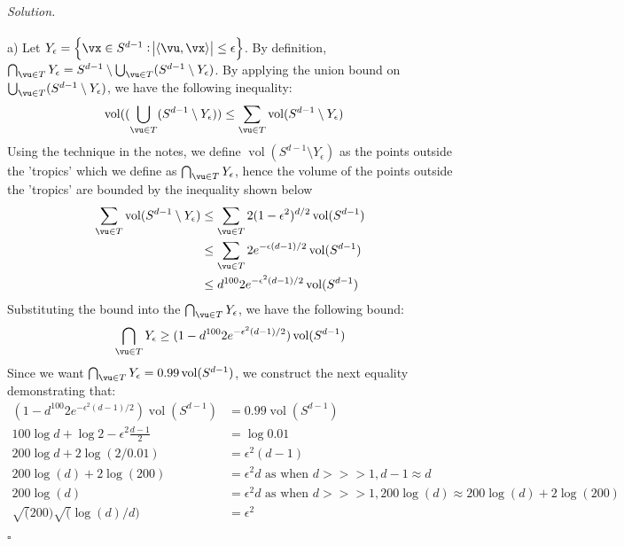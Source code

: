 \documentclass[11pt]{article}
\newcommand\ip[1]{\langle #1 \rangle} %
\newcommand{\vol}{\ensuremath{\operatorname{vol}}} %
\newcommand{\unitsphere}[1][d-1]{\ensuremath{S^{#1}}} %
\theoremstyle{definition}
\newenvironment{solution}{\noindent\emph{Solution.}}{\hfill$\square$}
\begin{document}
\begin{solution}
\\ \\a)
Let $Y_{\epsilon} = \cbr{\vx \in \unitsphere : \abs{\ip{\vu,\vx}} \leq \epsilon}$. By definition, $ \bigcap_{\vu \in T} Y_{\epsilon} = \unitsphere \setminus \bigcup_{\vu \in T} (\unitsphere \setminus Y_{\epsilon})$. By applying the union bound on $\bigcup_{\vu \in T} (\unitsphere \setminus Y_{\epsilon})$, we have the following inequality:
\begin{align*}
\vol((\bigcup_{\vu \in T} (\unitsphere \setminus Y_{\epsilon})) 
&\leq \sum_{\vu \in T} \vol(\unitsphere \setminus Y_{\epsilon})
\end{align*}
Using the technique in the notes, we define $ \vol(\unitsphere \setminus Y_{\epsilon})$ as the points outside the 'tropics' which we define as $\bigcap_{\vu \in T} Y_{\epsilon}$, hence the volume of the points outside the 'tropics' are bounded by the inequality shown below
\begin{align*}
\sum_{\vu \in T} \vol(\unitsphere \setminus Y_{\epsilon}) 
&\leq \sum_{\vu \in T}  2(1 - \epsilon^2)^{d/2} \vol(\unitsphere) \\
&\leq \sum_{\vu \in T}  2e^{-\epsilon (d-1)/2}\vol(\unitsphere) \\
&\leq d^{100} 2e^{-\epsilon^2 (d-1)/2}\vol(\unitsphere)
\end{align*}
Substituting the bound into the $\bigcap_{\vu \in T} Y_{\epsilon}$,  we have the following bound:
\begin{align*}
\bigcap_{\vu \in T} Y_{\epsilon} \geq (1 - d^{100} 2e^{-\epsilon^2 (d-1)/2}) \vol(\unitsphere)
\end{align*}
Since we want $\bigcap_{\vu \in T} Y_{\epsilon} = 0.99 \vol(\unitsphere)$, we construct the next equality demonstrating that:
\begin{align*}
(1 - d^{100} 2e^{-\epsilon^2 (d-1)/2}) \vol(\unitsphere) 
&= 0.99 \vol(\unitsphere)\\
100 \log d + \log 2 - \epsilon^2 \frac{d-1}{2} 
&= \log 0.01\\
200\log d + 2\log(2/0.01) 
&= \epsilon^2 (d-1)\\
200\log(d) + 2\log(200)
&= \epsilon^2 d \textrm{ as when } d >>> 1, d - 1 \approx d  \\
200\log(d) 
&= \epsilon^2 d \textrm{ as when } d >>> 1, 200\log(d) \approx 200\log(d) + 2\log(200)  \\
\sqrt(200)\sqrt(\log(d)/d) 
&= \epsilon^2
\end{align*}

\end{solution}
\end{document}

